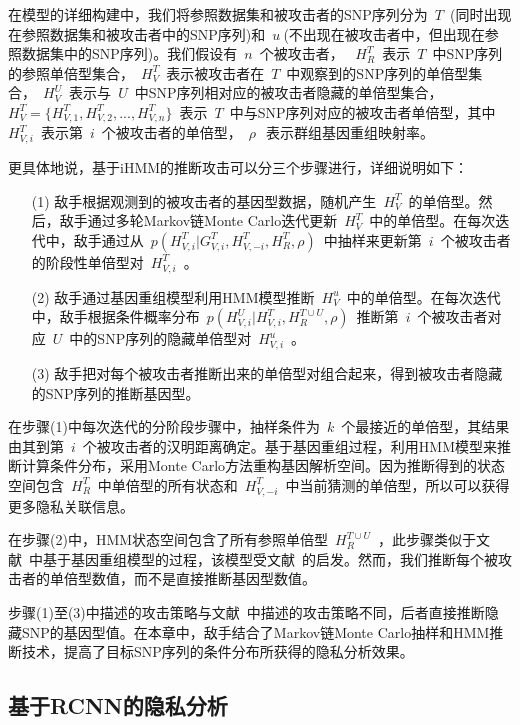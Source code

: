 在模型的详细构建中，我们将参照数据集和被攻击者的SNP序列分为~$T$~(同时出现在参照数据集和被攻击者中的SNP序列)和~$u~$(不出现在被攻击者中，但出现在参照数据集中的SNP序列)。我们假设有~$n$~个被攻击者， ~$H_R^T$~表示~$T$~中SNP序列的参照单倍型集合，~$H_V^T$~表示被攻击者在~$T$~中观察到的SNP序列的单倍型集合，~$H_V^U$~表示与~$U$~中SNP序列相对应的被攻击者隐藏的单倍型集合，~$H_V^T=\{H_{V,1}^T,H_{V,2}^T,..., H_{V,n}^T\}$~表示~$T$~中与SNP序列对应的被攻击者单倍型，其中~$H_{V,i}^T$~表示第~$i$~个被攻击者的单倍型，~$\rho~$~表示群组基因重组映射率。

更具体地说，基于iHMM的推断攻击可以分三个步骤进行，详细说明如下：
\begin{enumerate}
	\item[(1)] 敌手根据观测到的被攻击者的基因型数据，随机产生~$H_V^T$~的单倍型。然后，敌手通过多轮Markov链Monte Carlo迭代更新~$H_V^T$~中的单倍型。在每次迭代中，敌手通过从~$p(H_{V,i}^T|G_{V,i}^T,H_{V,-i}^T,H_R^T,\rho)$~中抽样来更新第~$i$~个被攻击者的阶段性单倍型对~$H_{V,i}^T$~。
	\item[(2)] 敌手通过基因重组模型利用HMM模型推断~$H_V^u$~中的单倍型。在每次迭代中，敌手根据条件概率分布~$p(H_{V,i}^U|H_{V,i}^T, H_R^{T \cup U},\rho)$~推断第~$i$~个被攻击者对应~$U$~中的SNP序列的隐藏单倍型对~$H_{V,i}^u$~。 
	\item[(3)] 敌手把对每个被攻击者推断出来的单倍型对组合起来，得到被攻击者隐藏的SNP序列的推断基因型。
\end{enumerate}

在步骤(1)中每次迭代的分阶段步骤中，抽样条件为~$k$~个最接近的单倍型，其结果由其到第~$i$~个被攻击者的汉明距离确定。基于基因重组过程，利用HMM模型来推断计算条件分布，采用Monte Carlo方法重构基因解析空间。因为推断得到的状态空间包含~$H_R^T$~中单倍型的所有状态和~$H_{V,-i}^T$~中当前猜测的单倍型，所以可以获得更多隐私关联信息。

在步骤(2)中，HMM状态空间包含了所有参照单倍型~$H_R^{T \cup U}$~，此步骤类似于文献~\cite{samani2015quantifying}中基于基因重组模型的过程，该模型受文献~\cite{marchini2007newa}的启发。然而，我们推断每个被攻击者的单倍型数值，而不是直接推断基因型数值。

步骤(1)至(3)中描述的攻击策略与文献~\cite{samani2015quantifying}中描述的攻击策略不同，后者直接推断隐藏SNP的基因型值。在本章中，敌手结合了Markov链Monte Carlo抽样和HMM推断技术，提高了目标SNP序列的条件分布所获得的隐私分析效果。

\subsection{基于RCNN的隐私分析}

